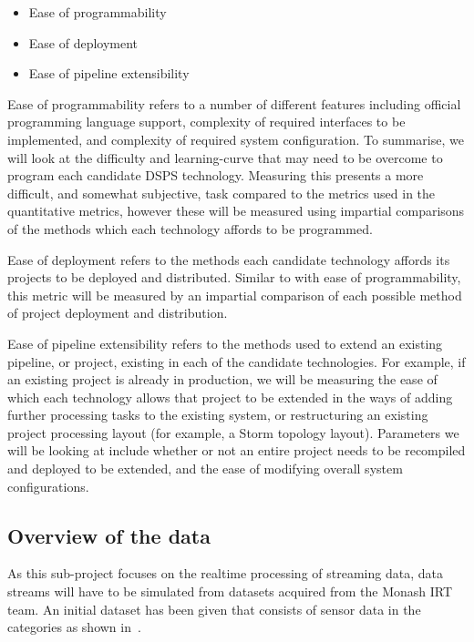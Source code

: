 \begin{itemize}
  \item Ease of programmability
  \item Ease of deployment
  \item Ease of pipeline extensibility
\end{itemize}

Ease of programmability refers to a number of different features including official programming language support, complexity
of required interfaces to be implemented, and complexity of required system configuration. To summarise, we will look at
the difficulty and learning-curve that may need to be overcome to program each candidate DSPS technology. Measuring this
presents a more difficult, and somewhat subjective, task compared to the metrics used in the quantitative metrics, however
these will be measured using impartial comparisons of the methods which each technology affords to be programmed.

Ease of deployment refers to the methods each candidate technology affords its projects to be deployed and distributed.
Similar to with ease of programmability, this metric will be measured by an impartial comparison of each possible
method of project deployment and distribution.

Ease of pipeline extensibility refers to the methods used to extend an existing pipeline, or project, existing in each
of the candidate technologies. For example, if an existing project is already in production, we will be measuring the
ease of which each technology allows that project to be extended in the ways of adding further processing tasks to the
existing system, or restructuring an existing project processing layout (for example, a Storm topology layout). Parameters
we will be looking at include whether or not an entire project needs to be recompiled and deployed to be extended, and the
ease of modifying overall system configurations.




\subsection{Overview of the data} %
\label{sub:overview_of_the_data}

As this sub-project focuses on the realtime processing of streaming data, data streams will have to be simulated from
datasets acquired from the Monash IRT team. An initial dataset has been given that consists of sensor data in the
categories as shown in~.

